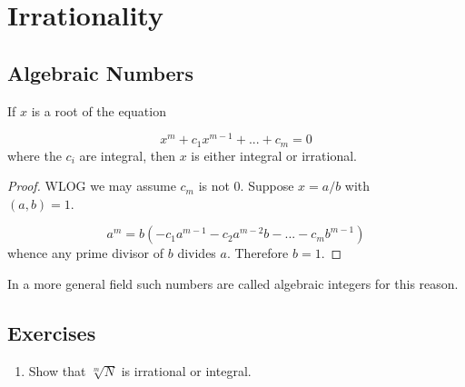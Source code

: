 \section{Irrationality}

\subsection{Algebraic Numbers}
\begin{theorem}\label{RRT}
    If $x$ is a root of the equation

    \begin{equation*}
        x^m + c_1x^{m-1} + ... + c_m = 0
    \end{equation*}
    \noi
    where the $c_i$ are integral, then $x$ is either integral or irrational.
\end{theorem}

\begin{proof}
    WLOG we may assume $c_m$ is not 0. Suppose $x = a/b$ with \\ $(a,b) = 1$.

    \begin{equation*}
        a^m = b(-c_1 a^{m-1} - c_2 a^{m-2}b - ... - c_m b^{m-1})
    \end{equation*}
    whence any prime divisor of $b$ divides $a$. Therefore $b=1$.
\end{proof}

\begin{remark}
    In a more general field such numbers are called algebraic integers for this reason.
\end{remark}

\subsection{Exercises}
\begin{enumerate}
    \item Show that $\sqrt[m]{N}$ is irrational or integral. 
\end{enumerate}

